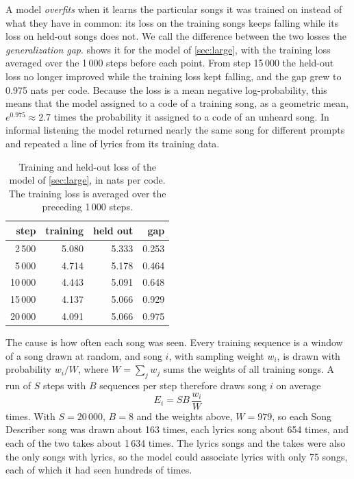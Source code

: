 A model \emph{overfits} when it learns the particular songs it was trained on
instead of what they have in common: its loss on the training songs keeps
falling while its loss on held-out songs does not. We call the difference
between the two losses the \emph{generalization gap}. 
shows it for the model of \cref{sec:large}, with the training loss averaged
over the 1\,000 steps before each point. From step 15\,000 the held-out loss
no longer improved while the training loss kept falling, and the gap grew to
0.975 nats per code. Because the loss is a mean negative log-probability, this
means that the model assigned to a code of a training song, as a geometric
mean, $e^{0.975} \approx 2.7$ times the probability it assigned to a code of an
unheard song. In informal listening the model returned nearly the same song for
different prompts and repeated a line of lyrics from its training data.

\begin{table}[htbp]
\centering
\caption{Training and held-out loss of the model of \cref{sec:large}, in nats
per code. The training loss is averaged over the preceding 1\,000 steps.}
\label{tab:overfitting}
\small
\begin{tabular}{rrrr}
\toprule
step & training & held out & gap \\
\midrule
2\,500 & 5.080 & 5.333 & 0.253 \\
5\,000 & 4.714 & 5.178 & 0.464 \\
10\,000 & 4.443 & 5.091 & 0.648 \\
15\,000 & 4.137 & 5.066 & 0.929 \\
20\,000 & 4.091 & 5.066 & 0.975 \\
\bottomrule
\end{tabular}
\end{table}

The cause is how often each song was seen. Every training sequence is a window
of a song drawn at random, and song $i$, with sampling weight $w_i$, is drawn
with probability $w_i / W$, where $W = \sum_j w_j$ sums the weights of all
training songs. A run of $S$ steps with $B$ sequences per step therefore draws
song $i$ on average
\begin{equation}
  E_i = S B \, \frac{w_i}{W}
  \label{eq:draws}
\end{equation}
times. With $S = 20\,000$, $B = 8$ and the weights above, $W = 979$, so each
Song Describer song was drawn about 163 times, each lyrics song about 654
times, and each of the two takes about 1\,634 times. The lyrics songs and the
takes were also the only songs with lyrics, so the model could associate lyrics
with only 75 songs, each of which it had seen hundreds of times.

